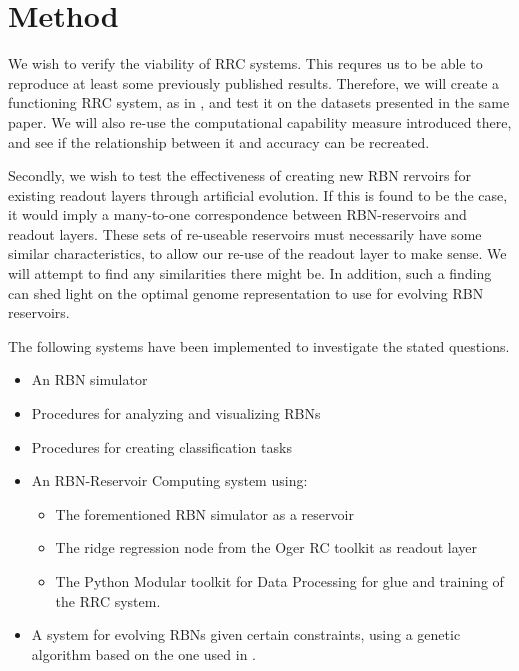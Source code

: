 \section{Method}

We wish to verify the viability of RRC systems.
This requres us to be able to reproduce at least some previously published results.
Therefore, we will create a functioning RRC system, as in \cite{rbn-reservoir},
and test it on the datasets presented in the same paper.
We will also re-use the computational capability measure introduced there,
and see if the relationship between it and accuracy can be recreated.

Secondly, we wish to test the effectiveness of creating new RBN rervoirs for existing readout layers through artificial evolution.
If this is found to be the case, it would imply a many-to-one correspondence between RBN-reservoirs and readout layers.
These sets of re-useable  reservoirs must necessarily have some similar characteristics,
to allow our re-use of the readout layer to make sense.
We will attempt to find any similarities there might be.
In addition, such a finding can shed light on the optimal genome representation to use for evolving RBN reservoirs.

The following systems have been implemented to investigate the stated questions.

\begin{itemize}
  \item An RBN simulator
  \item Procedures for analyzing and visualizing RBNs
  \item Procedures for creating classification tasks

  \item An RBN-Reservoir Computing system using:
  \begin{itemize}
    \item The forementioned RBN simulator as a reservoir
    \item The ridge regression node from the Oger RC toolkit \cite{verstraeten2012oger} as readout layer
    \item The Python Modular toolkit for Data Processing \cite{zito2008modular} for glue and training of the RRC system.
  \end{itemize}
  \item A system for evolving RBNs given certain constraints, using a genetic algorithm based on the one used in \cite{farstad2015evolving}.
\end{itemize}


